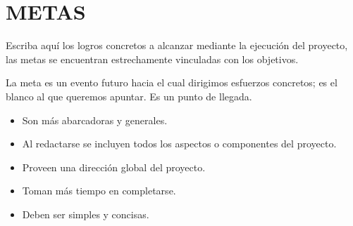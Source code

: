 \section*{METAS}
\justifying

Escriba aquí los logros concretos a alcanzar mediante la ejecución del proyecto, las metas se encuentran estrechamente vinculadas con los objetivos.

La meta es un evento futuro hacia el cual dirigimos esfuerzos concretos; es el blanco al que queremos apuntar. Es un punto de llegada.

\begin{itemize}
    \item Son más abarcadoras y generales.
    \item Al redactarse se incluyen todos los aspectos o componentes del proyecto.
    \item Proveen una dirección global del proyecto.
    \item Toman más tiempo en completarse.
    \item Deben ser simples y concisas.
\end{itemize}